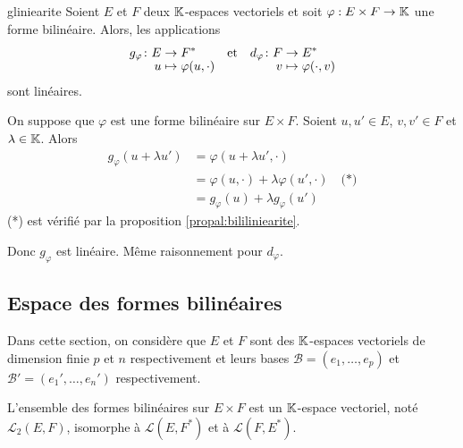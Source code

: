 \documentclass[a4paper, 12pt]{article}
\begin{document}
\begin{proposition}{}{gliniearite}
    Soient $E$ et $F$ deux $\mathbb{K}$-espaces vectoriels et soit $\varphi: E \times F \to \mathbb{K}$ une forme bilinéaire. Alors, les applications
    $$
    \funcdef{g_\varphi}{E}{F^*}{u}{\varphi(u, \cdot)} \quad \text{et} \quad \funcdef{d_\varphi}{F}{E^*}{v}{\varphi(\cdot, v)}
    $$
    sont linéaires.
\end{proposition}

\begin{demonstration}
    On suppose que $\varphi$ est une forme bilinéaire sur $E \times F$. Soient $u, u' \in E$, $v, v' \in F$ et $\lambda \in \mathbb{K}$. Alors
    \begin{align*}
        g_\varphi(u + \lambda u') &= \varphi(u + \lambda u', \cdot) \\
        &= \varphi(u, \cdot) + \lambda \varphi(u', \cdot) \quad \text{(*)} \\
        &= g_\varphi(u) + \lambda g_\varphi(u')
    \end{align*}
    (*) est vérifié par la proposition \ref{propal:bililiniearite}.

    Donc $g_\varphi$ est linéaire. Même raisonnement pour $d_\varphi$.
\end{demonstration}

\subsection{Espace des formes bilinéaires}

Dans cette section, on considère que $E$ et $F$ sont des $\mathbb{K}$-espaces vectoriels de dimension finie $p$ et $n$ respectivement et leurs bases $\mathscr{B} = (e_1, \dots, e_p)$ et $\mathscr{B'} = (e_1', \dots, e_n')$ respectivement.
\vspace{1cm}

\begin{proposition}{}{}
    L'ensemble des formes bilinéaires sur $E \times F$ est un $\mathbb{K}$-espace vectoriel, noté $\mathcal{L}_2(E, F)$,
    isomorphe à $\mathcal{L}(E, F^*)$ et à $\mathcal{L}(F, E^*)$.
\end{proposition}
\end{document}
